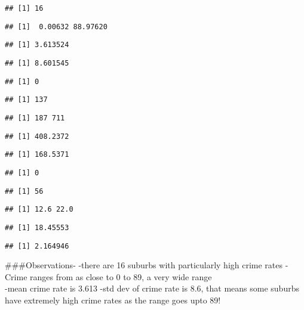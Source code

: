 \documentclass[
]{article}
\begin{document}
\begin{verbatim}
## [1] 16
\end{verbatim}

\begin{verbatim}
## [1]  0.00632 88.97620
\end{verbatim}

\begin{verbatim}
## [1] 3.613524
\end{verbatim}

\begin{verbatim}
## [1] 8.601545
\end{verbatim}

\begin{verbatim}
## [1] 0
\end{verbatim}

\begin{verbatim}
## [1] 137
\end{verbatim}

\begin{verbatim}
## [1] 187 711
\end{verbatim}

\begin{verbatim}
## [1] 408.2372
\end{verbatim}

\begin{verbatim}
## [1] 168.5371
\end{verbatim}

\begin{verbatim}
## [1] 0
\end{verbatim}

\begin{verbatim}
## [1] 56
\end{verbatim}

\begin{verbatim}
## [1] 12.6 22.0
\end{verbatim}

\begin{verbatim}
## [1] 18.45553
\end{verbatim}

\begin{verbatim}
## [1] 2.164946
\end{verbatim}

\#\#\#Observations- -there are 16 suburbs with particularly high crime
rates -Crime ranges from as close to 0 to 89, a very wide range\\
-mean crime rate is 3.613 -std dev of crime rate is 8.6, that means some
suburbs have extremely high crime rates as the range goes upto 89!
\end{document}
